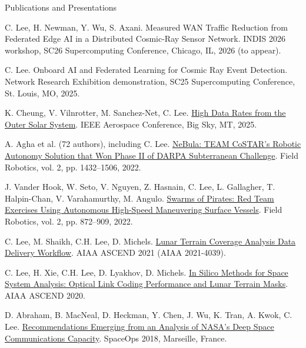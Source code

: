\documentclass{resume} %
\begin{document}
\newpage

\begin{rSection}{Publications and Presentations}
\item C. Lee, H. Newman, Y. Wu, S. Axani. Measured WAN Traffic Reduction from Federated Edge AI in a Distributed Cosmic-Ray Sensor Network. INDIS 2026 workshop, SC26 Supercomputing Conference, Chicago, IL, 2026 (to appear).
\item C. Lee. Onboard AI and Federated Learning for Cosmic Ray Event Detection. Network Research Exhibition demonstration, SC25 Supercomputing Conference, St. Louis, MO, 2025.
\item K. Cheung, V. Vilnrotter, M. Sanchez-Net, C. Lee. \href{https://github.com/carlynlee/lee-carlyn_resume/tree/master/papers/High_Data_Rates_from_the_Outer_Solar_System.pdf}{High Data Rates from the Outer Solar System}. IEEE Aerospace Conference, Big Sky, MT, 2025.
\item A. Agha et al. (72 authors), including C. Lee. \href{https://github.com/carlynlee/lee-carlyn_resume/tree/master/papers/2103.11470v4.pdf}{NeBula: TEAM CoSTAR's Robotic Autonomy Solution that Won Phase II of DARPA Subterranean Challenge}. Field Robotics, vol. 2, pp. 1432--1506, 2022.
\item J. Vander Hook, W. Seto, V. Nguyen, Z. Hasnain, C. Lee, L. Gallagher, T. Halpin-Chan, V. Varahamurthy, M. Angulo. \href{https://github.com/carlynlee/lee-carlyn_resume/tree/master/papers/Vol2_29.pdf}{Swarms of Pirates: Red Team Exercises Using Autonomous High-Speed Maneuvering Surface Vessels}. Field Robotics, vol. 2, pp. 872--909, 2022.
\item C. Lee, M. Shaikh, C.H. Lee, D. Michels. \href{https://github.com/carlynlee/lee-carlyn_resume/tree/master/papers/CL21_5108.pdf}{Lunar Terrain Coverage Analysis Data Delivery Workflow}. AIAA ASCEND 2021 (AIAA 2021-4039).
\item C. Lee, H. Xie, C.H. Lee, D. Lyakhov, D. Michels. \href{https://github.com/carlynlee/lee-carlyn_resume/tree/master/papers/CL20-4897.pdf}{In Silico Methods for Space System Analysis: Optical Link Coding Performance and Lunar Terrain Masks}. AIAA ASCEND 2020.
\item D. Abraham, B. MacNeal, D. Heckman, Y. Chen, J. Wu, K. Tran, A. Kwok, C. Lee. \href{https://github.com/carlynlee/lee-carlyn_resume/tree/master/papers/abraham-et-al-2018-recommendations-emerging-from-an-analysis-of-nasa-s-deep-space-communications-capacity.pdf}{Recommendations Emerging from an Analysis of NASA's Deep Space Communications Capacity}. SpaceOps 2018, Marseille, France.

\end{rSection}
\end{document}
